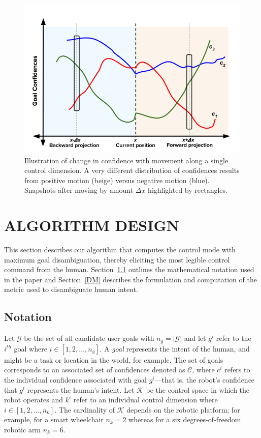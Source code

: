 \documentclass[conference]{IEEEtran}
\begin{document}
\begin{figure}
	\includegraphics[width = 1\hsize, height = 0.26\vsize]{./figures/DisambMetric_New2.png}
	\vspace{-0.4cm}
	\caption{Illustration of change in confidence with movement along a single control dimension. A very different distribution of confidences results from positive motion (beige) versus negative motion (blue). Snapshots after moving by amount $\Delta x$ highlighted by rectangles.}
	\label{DM_FIG}
\end{figure}
\section{ALGORITHM DESIGN} \label{ALGO}
This section describes our algorithm that computes the control mode with maximum goal disambiguation, thereby eliciting the most legible control command from the human. Section~\ref{NOT} outlines the mathematical notation used in the paper and Section~\ref{DM} describes the formulation and computation of the metric used to disambiguate human intent. 

\subsection{Notation}\label{NOT}

Let $\mathcal{G}$ be the set of all candidate user goals with $n_g = \vert\mathcal{G}\vert$ and let $g^{i}$ refer to the $i^{th}$ goal where $i \in [1,2,\dots,n_g]$. A \textit{goal} represents the intent of the human, and might be a task or location in the world, for example. The set of goals corresponds to an associated set of confidences denoted as $\mathcal{C}$, where $c^{i}$ refers to the individual confidence associated with goal $g^{i}$---that is, the robot's confidence that $g^{i}$ represents the human's intent. Let $\mathcal{K}$ be the control space in which the robot operates and $k^{i}$ refer to an individual control dimension where $i \in [1,2,\dots,n_k]$.  The cardinality of $\mathcal{K}$ depends on the robotic platform; for example, for a smart wheelchair $n_k = 2$ whereas for a six degrees-of-freedom robotic arm $n_k = 6$.
\end{document}
